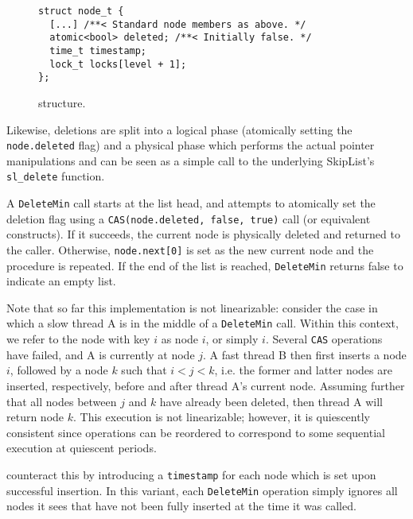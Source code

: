\begin{figure}[ht]
\begin{lstlisting}
struct node_t {
  [...] /**< Standard node members as above. */
  atomic<bool> deleted; /**< Initially false. */
  time_t timestamp;
  lock_t locks[level + 1];
};
\end{lstlisting}
\caption{\citeauthor{shavit2000skiplist} structure.}
\label{fig:shavitsl}
\end{figure}

Likewise, deletions are split into a logical phase (atomically setting the \lstinline|node.deleted|
flag) and a physical phase which performs the actual pointer manipulations and can be seen as a simple
call to the underlying SkipList's \lstinline|sl_delete| function.

A \lstinline|DeleteMin| call starts at the list head, and attempts to atomically set
the deletion flag using a \lstinline|CAS(node.deleted, false, true)| call (or equivalent constructs).
If it succeeds, the current node is physically deleted and returned to the caller. Otherwise,
\lstinline|node.next[0]| is set as the new current node and the procedure is repeated.
If the end of the list is reached, \lstinline|DeleteMin| returns false to indicate an empty list.


Note that so far this implementation is not linearizable: consider the case in which a
slow thread A is in the middle of a \lstinline|DeleteMin| call. Within this context, we refer to
the node with key $i$ as node $i$, or simply $i$. Several \lstinline|CAS|
operations have failed, and A is currently at node $j$.
A fast thread B then first inserts a node $i$, followed by a node $k$ such that
$i < j < k$, i.e. the former and latter nodes are inserted, respectively, before and after
thread A's current node. Assuming further that all nodes between $j$ and $k$ have already
been deleted, then thread A will return node $k$. This execution is not linearizable; however,
it is quiescently consistent since operations can be reordered to correspond to some sequential
execution at quiescent periods.

\citeauthor{shavit2000skiplist} counteract this by introducing a \lstinline|timestamp| for each
node which is set upon successful insertion. In this variant, each \lstinline|DeleteMin| operation
simply ignores all nodes it sees that have not been fully inserted at the time it was called.

